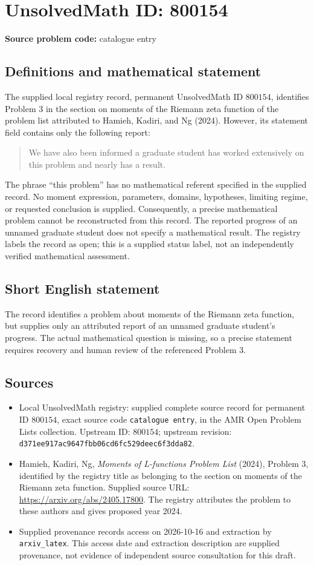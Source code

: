 \documentclass[11pt]{article}
\begin{document}
\section*{UnsolvedMath ID: 800154}
\textbf{Source problem code:} catalogue entry
\subsection{Definitions and mathematical statement}
The supplied local registry record, permanent UnsolvedMath ID \(800154\), identifies Problem 3 in the section on moments of the Riemann zeta function of the problem list attributed to Hamieh, Kadiri, and Ng (2024). However, its statement field contains only the following report:
\begin{quote}
We have also been informed a graduate student has worked extensively on this problem and nearly has a result.
\end{quote}
The phrase ``this problem'' has no mathematical referent specified in the supplied record. No moment expression, parameters, domains, hypotheses, limiting regime, or requested conclusion is supplied. Consequently, a precise mathematical problem cannot be reconstructed from this record. The reported progress of an unnamed graduate student does not specify a mathematical result. The registry labels the record as open; this is a supplied status label, not an independently verified mathematical assessment.
\subsection{Short English statement}
The record identifies a problem about moments of the Riemann zeta function, but supplies only an attributed report of an unnamed graduate student's progress. The actual mathematical question is missing, so a precise statement requires recovery and human review of the referenced Problem 3.
\subsection{Sources}
\begin{itemize}
\item Local UnsolvedMath registry: supplied complete source record for permanent ID \(800154\), exact source code \texttt{catalogue entry}, in the AMR Open Problem Lists collection. Upstream ID: \(800154\); upstream revision: \texttt{d371ee917ac9647fbb06cd6fc529deec6f3dda82}.
\item Hamieh, Kadiri, Ng, \emph{Moments of L-functions Problem List} (2024), Problem 3, identified by the registry title as belonging to the section on moments of the Riemann zeta function. Supplied source URL: \url{https://arxiv.org/abs/2405.17800}. The registry attributes the problem to these authors and gives proposed year 2024.
\item Supplied provenance records access on 2026-10-16 and extraction by \texttt{arxiv\_latex}. This access date and extraction description are supplied provenance, not evidence of independent source consultation for this draft.
\end{itemize}
\end{document}
